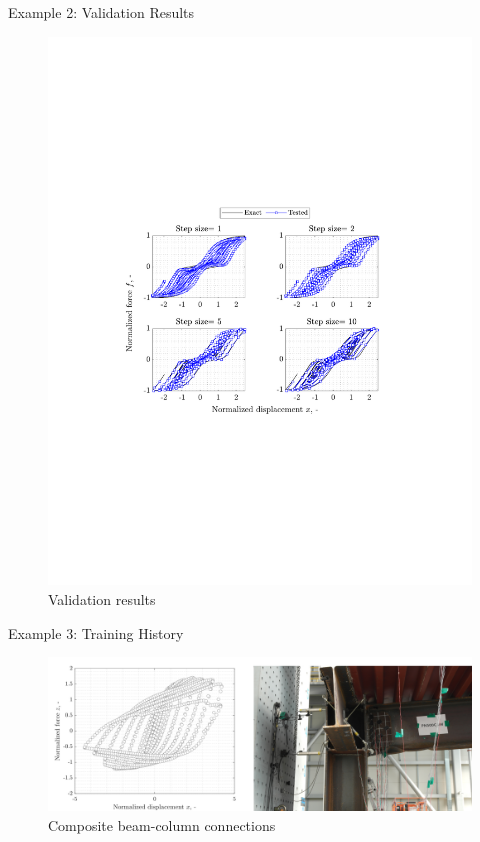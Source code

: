 \documentclass[9pt]{beamer}
\newcounter{frame}[frame]
\begin{document}
\begin{frame}{Example 2: Validation Results}
\begin{figure}
	\includegraphics[height=.8\textheight]{neuralNetHysteresis02Test}
	\caption{Validation results}
\end{figure}
\end{frame}

\begin{frame}{Example 3: Training History}
\begin{figure}
	\includegraphics[height=.4\textheight]{testResult}
	\caption{Composite beam-column connections}
\end{figure}
\end{frame}
\end{document}
